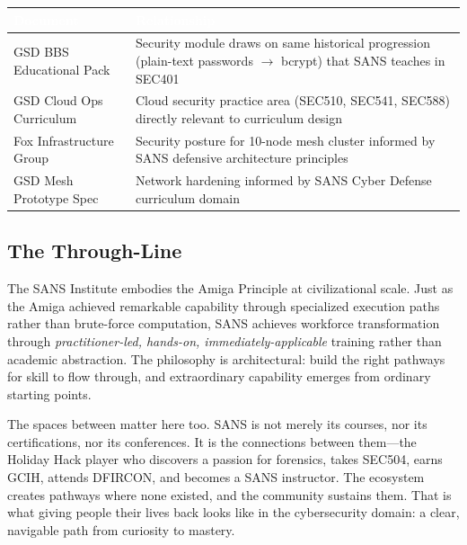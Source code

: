 \documentclass[11pt,letterpaper]{article}
\newcommand{\stageheader}[2]{%
  \noindent\colorbox{#2}{\makebox[\textwidth][l]{%
    \textcolor{white}{\bfseries\sffamily\hspace{6pt}#1\hspace{6pt}}}}%
  \vspace{0.5em}\par%
}
\newcommand{\tableheader}[1]{\textbf{\sffamily\textcolor{white}{#1}}}
\begin{document}
\begin{center}
\begin{tabularx}{\textwidth}{L{4.5cm}X}
\toprule
{}
\tableheader{Document} & \tableheader{Relationship} \\
\midrule
GSD BBS Educational Pack & Security module draws on same historical progression (plain-text passwords $\rightarrow$ bcrypt) that SANS teaches in SEC401 \\
GSD Cloud Ops Curriculum & Cloud security practice area (SEC510, SEC541, SEC588) directly relevant to curriculum design \\
Fox Infrastructure Group & Security posture for 10-node mesh cluster informed by SANS defensive architecture principles \\
GSD Mesh Prototype Spec & Network hardening informed by SANS Cyber Defense curriculum domain \\
\bottomrule
\end{tabularx}
\end{center}

\subsection{The Through-Line}

The SANS Institute embodies the Amiga Principle at civilizational scale. Just as the Amiga achieved remarkable capability through specialized execution paths rather than brute-force computation, SANS achieves workforce transformation through \emph{practitioner-led, hands-on, immediately-applicable} training rather than academic abstraction. The philosophy is architectural: build the right pathways for skill to flow through, and extraordinary capability emerges from ordinary starting points.

The spaces between matter here too. SANS is not merely its courses, nor its certifications, nor its conferences. It is the connections between them---the Holiday Hack player who discovers a passion for forensics, takes SEC504, earns GCIH, attends DFIRCON, and becomes a SANS instructor. The ecosystem creates pathways where none existed, and the community sustains them. That is what giving people their lives back looks like in the cybersecurity domain: a clear, navigable path from curiosity to mastery.

\newpage

\stageheader{STAGE 2 --- RESEARCH REFERENCE}{secondary}
\end{document}
